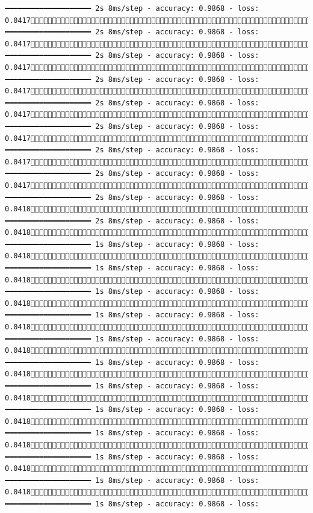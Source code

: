 \documentclass[
  letterpaper,
  DIV=11,
  numbers=noendperiod]{scrreprt}
\begin{document}
\begin{verbatim}
━━━━━━━━━━━━━━━━━━━━ 2s 8ms/step - accuracy: 0.9868 - loss: 0.04171550/1875 ━━━━━━━━━━━━━━━━━━━━ 2s 8ms/step - accuracy: 0.9868 - loss: 0.04171557/1875 ━━━━━━━━━━━━━━━━━━━━ 2s 8ms/step - accuracy: 0.9868 - loss: 0.04171564/1875 ━━━━━━━━━━━━━━━━━━━━ 2s 8ms/step - accuracy: 0.9868 - loss: 0.04171572/1875 ━━━━━━━━━━━━━━━━━━━━ 2s 8ms/step - accuracy: 0.9868 - loss: 0.04171579/1875 ━━━━━━━━━━━━━━━━━━━━ 2s 8ms/step - accuracy: 0.9868 - loss: 0.04171587/1875 ━━━━━━━━━━━━━━━━━━━━ 2s 8ms/step - accuracy: 0.9868 - loss: 0.04171594/1875 ━━━━━━━━━━━━━━━━━━━━ 2s 8ms/step - accuracy: 0.9868 - loss: 0.04171601/1875 ━━━━━━━━━━━━━━━━━━━━ 2s 8ms/step - accuracy: 0.9868 - loss: 0.04181608/1875 ━━━━━━━━━━━━━━━━━━━━ 2s 8ms/step - accuracy: 0.9868 - loss: 0.04181615/1875 ━━━━━━━━━━━━━━━━━━━━ 1s 8ms/step - accuracy: 0.9868 - loss: 0.04181621/1875 ━━━━━━━━━━━━━━━━━━━━ 1s 8ms/step - accuracy: 0.9868 - loss: 0.04181628/1875 ━━━━━━━━━━━━━━━━━━━━ 1s 8ms/step - accuracy: 0.9868 - loss: 0.04181635/1875 ━━━━━━━━━━━━━━━━━━━━ 1s 8ms/step - accuracy: 0.9868 - loss: 0.04181643/1875 ━━━━━━━━━━━━━━━━━━━━ 1s 8ms/step - accuracy: 0.9868 - loss: 0.04181650/1875 ━━━━━━━━━━━━━━━━━━━━ 1s 8ms/step - accuracy: 0.9868 - loss: 0.04181657/1875 ━━━━━━━━━━━━━━━━━━━━ 1s 8ms/step - accuracy: 0.9868 - loss: 0.04181664/1875 ━━━━━━━━━━━━━━━━━━━━ 1s 8ms/step - accuracy: 0.9868 - loss: 0.04181670/1875 ━━━━━━━━━━━━━━━━━━━━ 1s 8ms/step - accuracy: 0.9868 - loss: 0.04181677/1875 ━━━━━━━━━━━━━━━━━━━━ 1s 8ms/step - accuracy: 0.9868 - loss: 0.04181684/1875 ━━━━━━━━━━━━━━━━━━━━ 1s 8ms/step - accuracy: 0.9868 - loss: 0.04181691/1875 ━━━━━━━━━━━━━━━━━━━━ 1s 8ms/step - accuracy: 0.9868 - loss: 
\end{verbatim}
\end{document}
